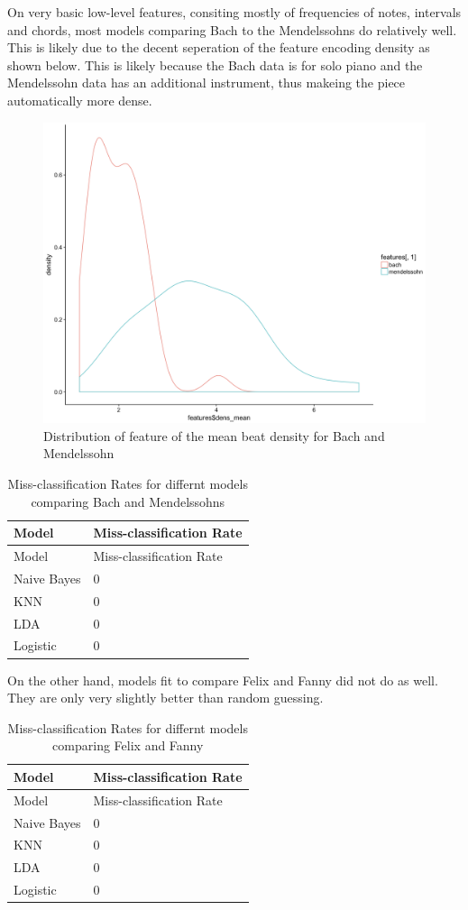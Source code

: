 \documentclass[12pt,twoside]{reedthesis}
\theoremstyle{definition}
\theoremstyle{definition}
\theoremstyle{definition}
\theoremstyle{remark}
\begin{document}
On very basic low-level features, consiting mostly of frequencies of
notes, intervals and chords, most models comparing Bach to the
Mendelssohns do relatively well. This is likely due to the decent
seperation of the feature encoding density as shown below. This is
likely because the Bach data is for solo piano and the Mendelssohn data
has an additional instrument, thus makeing the piece automatically more
dense.
\begin{figure}[h]
\centering
\includegraphics[scale = .5]{images/dens.png}
\caption{Distribution of feature of the mean beat density for Bach and Mendelssohn}
\label{subd}
\end{figure}
\begin{longtable}[]{@{}ll@{}}
\caption{Miss-classification Rates for differnt models comparing Bach
and Mendelssohns}\tabularnewline
\toprule
Model & Miss-classification Rate\tabularnewline
\midrule
\endfirsthead
\toprule
Model & Miss-classification Rate\tabularnewline
\midrule
\endhead
Naive Bayes & 0\tabularnewline
KNN & 0\tabularnewline
LDA & 0\tabularnewline
Logistic & 0\tabularnewline
\bottomrule
\end{longtable}
On the other hand, models fit to compare Felix and Fanny did not do as
well. They are only very slightly better than random guessing.
\begin{longtable}[]{@{}ll@{}}
\caption{Miss-classification Rates for differnt models comparing Felix
and Fanny}\tabularnewline
\toprule
Model & Miss-classification Rate\tabularnewline
\midrule
\endfirsthead
\toprule
Model & Miss-classification Rate\tabularnewline
\midrule
\endhead
Naive Bayes & 0\tabularnewline
KNN & 0\tabularnewline
LDA & 0\tabularnewline
Logistic & 0\tabularnewline
\bottomrule
\end{longtable}
\end{document}
